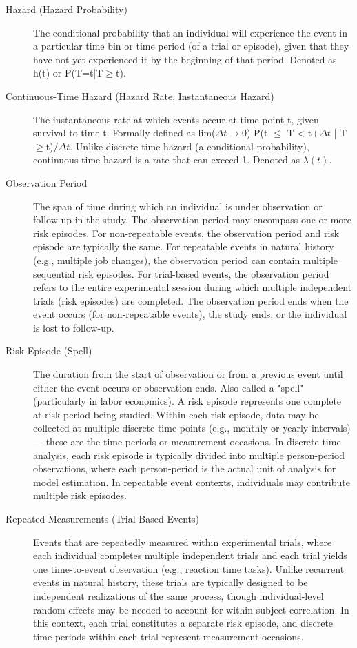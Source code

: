 \documentclass[
  english,
  man, donotrepeattitle,floatsintext]{apa6}
\begin{document}
\begin{description}
\item[Hazard (Hazard Probability)] The conditional probability that an individual will experience the event in a particular time bin or time period (of a trial or episode), given that they have not yet experienced it by the beginning of that period. Denoted as h(t) or P(T=t|T$\geq$t).

\item[Continuous-Time Hazard (Hazard Rate, Instantaneous Hazard)] The instantaneous rate at which events occur at time point t, given survival to time t. Formally defined as lim($\Delta t \to 0$) P(t $\leq$ T < t+$\Delta t$ | T$\geq$t)/$\Delta t$. Unlike discrete-time hazard (a conditional probability), continuous-time hazard is a rate that can exceed 1. Denoted as $\lambda(t)$.

\item[Observation Period] The span of time during which an individual is under observation or follow-up in the study. The observation period may encompass one or more risk episodes. For non-repeatable events, the observation period and risk episode are typically the same. For repeatable events in natural history (e.g., multiple job changes), the observation period can contain multiple sequential risk episodes. For trial-based events, the observation period refers to the entire experimental session during which multiple independent trials (risk episodes) are completed. The observation period ends when the event occurs (for non-repeatable events), the study ends, or the individual is lost to follow-up.

\item[Risk Episode (Spell)] The duration from the start of observation or from a previous event until either the event occurs or observation ends. Also called a "spell" (particularly in labor economics). A risk episode represents one complete at-risk period being studied. Within each risk episode, data may be collected at multiple discrete time points (e.g., monthly or yearly intervals) — these are the time periods or measurement occasions. In discrete-time analysis, each risk episode is typically divided into multiple person-period observations, where each person-period is the actual unit of analysis for model estimation. In repeatable event contexts, individuals may contribute multiple risk episodes.

\item[Repeated Measurements (Trial-Based Events)] Events that are repeatedly measured within experimental trials, where each individual completes multiple independent trials and each trial yields one time-to-event observation (e.g., reaction time tasks). Unlike recurrent events in natural history, these trials are typically designed to be independent realizations of the same process, though individual-level random effects may be needed to account for within-subject correlation. In this context, each trial constitutes a separate risk episode, and discrete time periods within each trial represent measurement occasions.


\end{description}
\end{document}
